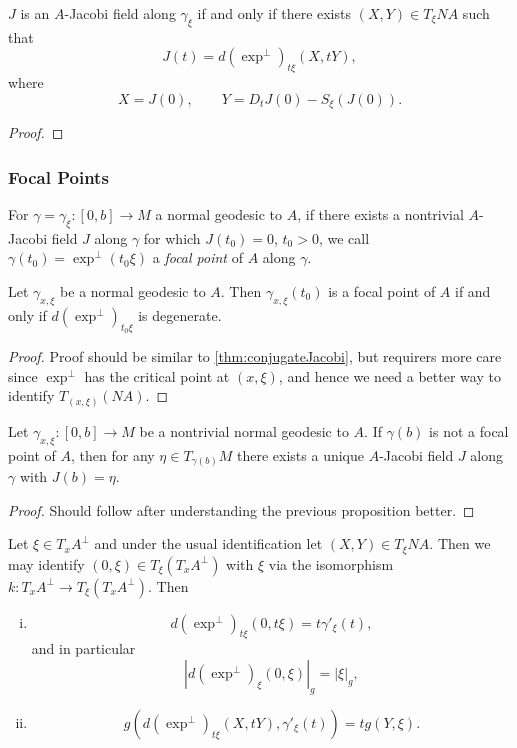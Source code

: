 \begin{cor}
    $J$ is an $A$-Jacobi field along $\gamma_\xi$ if and only if there exists $(X,Y)\in T_\xi NA$ such that
    $$J(t)=d(\exp^\perp)_{t\xi}(X,tY),$$
    where
    $$X=J(0),\qquad Y=D_tJ(0)-S_\xi(J(0)).$$
\end{cor}

\begin{proof}
\end{proof}



\subsubsection{Focal Points}

For $\gamma=\gamma_\xi:[0,b]\to M$ a normal geodesic to $A$, if there exists a nontrivial $A$-Jacobi field $J$ along $\gamma$ for which $J(t_0)=0$, $t_0>0$, we call $\gamma(t_0)=\exp^\perp(t_0\xi)$ a \textit{focal point} of $A$ along $\gamma$.

\begin{prop}
    Let $\gamma_{x,\xi}$ be a normal geodesic to $A$.  Then $\gamma_{x,\xi}(t_0)$ is a focal point of $A$ if and only if $d(\exp^\perp)_{t_0\xi}$ is degenerate.
\end{prop}

\begin{proof}
Proof should be similar to \cref{thm:conjugateJacobi}, but requirers more care since $\exp^\perp$ has the critical point at $(x,\xi)$, and hence we need a better way to identify $T_{(x,\xi)}(NA)$.

\end{proof}


\begin{cor}
    Let $\gamma_{x,\xi}:[0,b]\to M$ be a nontrivial normal geodesic to $A$.  If $\gamma(b)$ is not a focal point of $A$, then for any $\eta\in T_{\gamma(b)}M$ there exists a unique $A$-Jacobi field $J$ along $\gamma$ with $J(b)=\eta$.
\end{cor}

\begin{proof}
Should follow after understanding the previous proposition better.
\end{proof}


\begin{lem}
    Let $\xi\in T_xA^\perp$ and under the usual identification let $(X,Y)\in T_\xi NA$.  Then we may identify $(0,\xi)\in T_\xi (T_xA^\perp)$ with $\xi$ via the isomorphism $k:T_xA^\perp\to T_\xi (T_xA^\perp)$.  Then
    \begin{enumerate}[i.]
    	\item $$d(\exp^\perp)_{t\xi}(0,t\xi)=t\gamma'_\xi(t),$$
    		and in particular
    		$$|d(\exp^\perp)_\xi(0,\xi)|_g=|\xi|_g,$$
    	\item $$g(d(\exp^\perp)_{t\xi}(X,tY),\gamma'_\xi(t))=tg(Y,\xi).$$
    \end{enumerate}
\end{lem}

